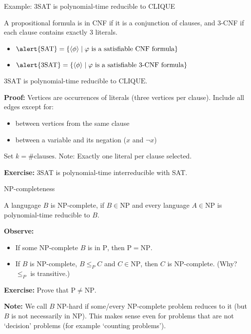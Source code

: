\documentclass[handout]{beamer}
\begin{document}
\begin{frame}{Example: 3SAT is polynomial-time reducible to CLIQUE}
    
    A propositional formula is in \alert{CNF} if it is a conjunction of clauses, and \alert{3-CNF} if each clause contains exactly 3 literals.

    \begin{itemize}
        \item $\alert{\mathrm{SAT}}=\{\langle\phi\rangle\mid \varphi\text{ is a satisfiable CNF formula}\}$
        \item $\alert{\mathrm{3SAT}}=\{\langle\phi\rangle\mid \varphi\text{ is a satisfiable 3-CNF formula}\}$
    \end{itemize}
    
    \begin{theorem}
        $\mathrm{3SAT}$ is polynomial-time reducible to $\mathrm{CLIQUE}$.
    \end{theorem}
    \textbf{Proof:} Vertices are occurrences of literals (three vertices per clause). Include all edges except for:
    \begin{itemize}
        \item between vertices from the same clause
        \item between a variable and its negation ($x$ and $\neg x$)
    \end{itemize}
    Set $k=\#\text{clauses}$. Note: Exactly one literal per clause selected.\hfill\qedsymbol

    \textbf{Exercise:} 3SAT is polynomial-time interreducible with SAT.

\end{frame}


\begin{frame}{NP-completeness}

    \begin{definition}
    A langugage $B$ is \alert{$\mathrm{NP}$-complete}, if $B\in\mathrm{NP}$ and every language $A\in \mathrm{NP}$ is polynomial-time reducible to $B$.
    \end{definition}
    
    \textbf{Observe:}
    \begin{itemize}
        \item If some $\mathrm{NP}$-complete $B$ is in $\mathrm{P}$, then $\mathrm{P}=\mathrm{NP}$.
        \item If $B$ is $\mathrm{NP}$-complete, $B\leq_P C$ and $C\in\mathrm{NP}$, then $C$ is $\mathrm{NP}$-complete. (Why? $\leq_P$ is transitive.)
    \end{itemize}

    \textbf{Exercise:} Prove that $\mathrm{P}\neq\mathrm{NP}$.

    \textbf{Note:} We call $B$ \alert{$\mathrm{NP}$-hard} if some/every $\mathrm{NP}$-complete problem reduces to it (but $B$ is not necessarily in $\mathrm{NP}$). This makes sense even for problems that are not `decision' problems (for example `counting problems').    

\end{frame}
\end{document}
